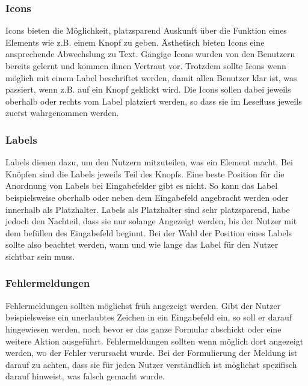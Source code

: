 \subsubsection{Icons}
Icons bieten die Möglichkeit, platzsparend Auskunft über die Funktion eines Elements wie z.B. einem Knopf zu geben.
Ästhetisch bieten Icons eine ansprechende Abwechslung zu Text.
Gängige Icons wurden von den Benutzern bereits gelernt und kommen ihnen Vertraut vor.
Trotzdem sollte Icons wenn möglich mit einem Label beschriftet werden, damit allen Benutzer klar ist, was passiert, wenn z.B. auf ein Knopf geklickt wird.
Die Icons sollen dabei jeweils oberhalb oder rechts vom Label platziert werden, so dass sie im Lesefluss jeweils zuerst wahrgenommen werden.

\subsubsection{Labels}
Labels dienen dazu, um den Nutzern mitzuteilen, was ein Element macht.
Bei Knöpfen sind die Labels jeweils Teil des Knopfs.
Eine beste Position für die Anordnung von Labels bei Eingabefelder gibt es nicht.
So kann das Label beispielsweise oberhalb oder neben dem Eingabefeld angebracht werden oder innerhalb als Platzhalter.
Labels als Platzhalter sind sehr platzsparend, habe jedoch den Nachteil, dass sie nur solange Angezeigt werden, bis der Nutzer mit dem befüllen des Eingabefeld beginnt.
Bei der Wahl der Position eines Labels sollte also beachtet werden, wann und wie lange das Label für den Nutzer sichtbar sein muss.

\subsubsection{Fehlermeldungen}
Fehlermeldungen sollten möglichst früh angezeigt werden.
Gibt der Nutzer beispielsweise ein unerlaubtes Zeichen in ein Eingabefeld ein, so soll er darauf hingewiesen werden, noch bevor er das ganze Formular abschickt oder eine weitere Aktion ausgeführt.
Fehlermeldungen sollten wenn möglich dort angezeigt werden, wo der Fehler verursacht wurde.
Bei der Formulierung der Meldung ist darauf zu achten, dass sie für jeden Nutzer verständlich ist möglichst spezifisch darauf hinweist, was falsch gemacht wurde.


